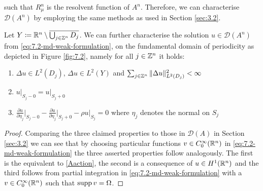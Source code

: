 such that $R_{\mu}^{n}$ is the resolvent function of $A^{n}$. Therefore, we can characterise $\mathcal{D}(A^{n})$ by employing the same methods as used in Section \ref{sec:3.2}.

\begin{theorem} \label{thrm:7.2}
Let $Y \coloneqq \mathbb{R}^{n} \setminus \overline{\bigcup_{j \in \mathbb{Z}^{n}} D_{j}}$. We can further characterise the solution $u \in \mathcal{D}(A^{n})$ from \eqref{eq:7.2-md-weak-formulation}, on the fundamental domain of periodicity as depicted in  Figure \ref{fig:7.2}, namely for all $j \in \mathbb{Z}^{n}$ it holds:
	\begin{enumerate}[label=\alph*\upshape)]
		\item $\Delta u \in L^{2}(D_{j})$, $\Delta u \in L^{2}(Y)$ and $\sum_{j \in \mathbb{Z}^{n}} \|\Delta u \|_{L^{2}(D_{j})}^{2} < \infty$
		\item $u \big|_{S_{j} - 0} = u \big|_{S_{j} + 0}$
		\item $\frac{\partial u}{\partial \eta_{j}} \big|_{S_{j} - 0} - \frac{\partial u}{\partial \eta_{j}} \big|_{S_{j} + 0} - \rho u \big|_{S_{j}} = 0$ where $\eta_{j}$ denotes the normal on $S_{j}$ %
	\end{enumerate}
\end{theorem}

\begin{proof}
 	Comparing the three claimed properties to those in $\mathcal{D}(A)$ in Section \ref{sec:3.2} we can see that by choosing particular functions $v \in C_{0}^{\infty}(\mathbb{R}^{n})$ in \eqref{eq:7.2-md-weak-formulation} the three asserted properties follow analogously. The first is the equivalent to \eqref{Aaction}, the second is a consequence of $u \in H^{1}(\mathbb{R}^{n})$ and the third follows from partial integration in \eqref{eq:7.2-md-weak-formulation} with a $v \in C_{0}^{\infty}(\mathbb{R}^{n})$ such that $\operatorname{supp} v = \Omega$.
\end{proof}

